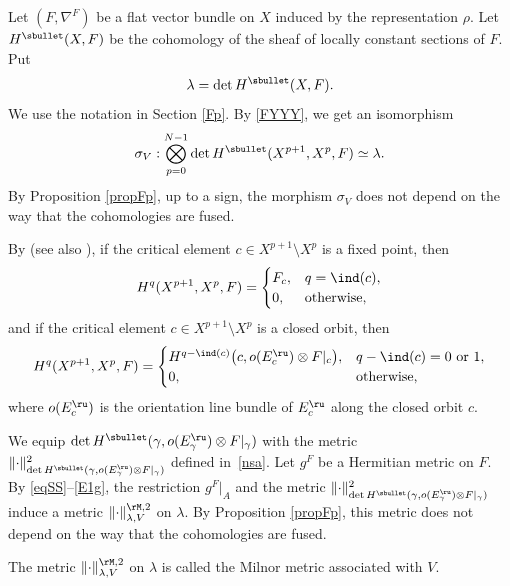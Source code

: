 Let $(F,\nabla^{F})$ be a flat vector bundle on $X$ induced by the representation
$\rho$.
Let $H^{\sbullet}(X,F)$ be the cohomology of the sheaf of locally constant
sections of $F$. Put
\begin{equation}\label{eqlambda}
\lambda=\det H^{\sbullet}(X,F).
\end{equation}
We use the notation in Section \ref{Fp}. By \eqref{FYYY}, we get an isomorphism
\begin{equation}\label{eqSS}
\sigma_{V}:\bigotimes_{p=0}^{N-1}\det
H^{\sbullet}(X^{p+1},X^{p},F)\simeq \lambda.
\end{equation}
By Proposition \ref{propFp}, up to a sign, the
morphism $\sigma_{V}$ does not depend on the way that the
cohomologies are fused.

By \cite[Th.\,9.11]{Franks1982} (see also \cite[\S 2]{MorgadoMorseSmale}), if the critical element $c\in
X^{p+1}\setminus X^{p}$ is a fixed
point, then
\begin{equation}\label{E1x}
H^{q}(X^{p+1},X^{p},F)=
\begin{cases}
F_{c},& q=\ind (c),\\
0,&\hbox{otherwise},
\end{cases}
\end{equation}
and if the critical element $c\in
X^{p+1}\setminus X^{p}$ is a closed orbit, then
\begin{equation}\label{E1g}
H^{q}(X^{p+1},X^{p},F)=
\begin{cases}
H^{q-\ind (c)}\big(c,o(E^{\ru}_{c})\otimes F|_{c}\big),& q-\ind( c)=0
\hbox{ or }1,\\
0,&\hbox{otherwise,}
\end{cases}
\end{equation}
where $o(E_{c}^{\ru})$ is the orientation line bundle of $E^{\ru}_{c}$ along the
closed orbit $c$.

We equip $\det
H^{\sbullet}(\gamma,o(E^{\ru}_{\gamma})\otimes
F|_{\gamma})$ with the metric $\|{\cdot}\|^{2}_{\det
H^{\sbullet}(\gamma,o(E^{\ru}_{\gamma})\otimes
F|_{\gamma})}$ defined in~\eqref{nsa}.
Let $g^{F}$ be a Hermitian metric on $F$. By \eqref{eqSS}--\eqref{E1g}, the
restriction $g^{F}|_{A}$
and the metric $\|{\cdot}\|^{2}_{\det
H^{\sbullet}(\gamma,o(E^{\ru}_{\gamma})\otimes
F|_{\gamma})}$ induce a metric
$\|{\cdot}\|^{\rM,2}_{\lambda,V}$ on
$\lambda$. By Proposition \ref{propFp},
this metric does not depend on the way that the
cohomologies are fused.

\begin{defin}
The metric $\|{\cdot}\|^{\rM,2}_{\lambda,V}$ on
$\lambda$ is called the Milnor metric associated with $V$.
\end{defin}


